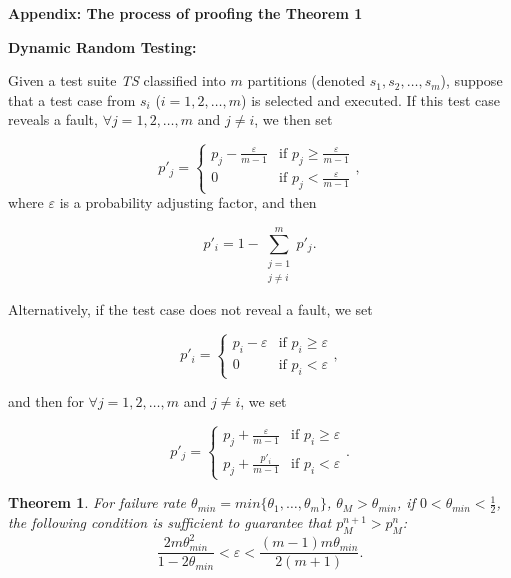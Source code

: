 \documentclass[10pt,journal,cspaper,compsoc,onecolumn]{IEEEtran}
\begin{document}
\large{\textbf{Appendix: The process of proofing the Theorem 1}}

\textbf{Dynamic Random Testing:}

Given a test suite \emph{TS} classified into $m$ partitions (denoted $s_1, s_2, \ldots, s_m$),  suppose that a test case from $s_i$ ($i = 1, 2, \ldots, m$) is selected and executed.
If this test case reveals a fault, $\forall j = 1, 2, \ldots, m$ and $j \neq i$, we then set

\begin{equation}
\label{eq:DRThitJ}
p'_j =
\begin{cases}
p_j - \displaystyle\frac{\varepsilon}{m-1} & \text{if } p_j \geq \displaystyle\frac{\varepsilon}{m-1} \\
0 & \text{if } p_j < \displaystyle\frac{\varepsilon}{m-1}
\end{cases},
\end{equation}
where $\varepsilon$ is a probability adjusting factor, and then

\begin{equation}
\label{eq:DRThitI}
  p'_i = 1 - \sum_{\substack{j = 1 \\ j \neq i}}^m p'_j.
\end{equation}

Alternatively, if the test case does not reveal a fault, we set

\begin{equation}
\label{eq:DRTmissI}
p'_i =
\begin{cases}
p_i - \varepsilon & \text{if } p_i \geq \varepsilon \\
0 & \text{if } p_i < \varepsilon
\end{cases},
\end{equation}

and then for $\forall j = 1, 2, \ldots, m$ and $j \neq i$, we set

\begin{equation}
\label{eq:DRTmissJ}
p'_j =
\begin{cases}
p_j + \displaystyle\frac{\varepsilon}{m-1} & \text{if } p_i \geq \varepsilon \\
p_j + \displaystyle\frac{p'_i}{m-1} & \text{if } p_i < \varepsilon
\end{cases}.
\end{equation}

\newtheorem{my}{Theorem}
\label{theorem}
\begin{my}
  For failure rate $\theta_{min} = min\{\theta_1, \ldots, \theta_m\}$, $\theta_M > \theta_{min}$, if $0 < \theta_{min} < \frac{1}{2}$, the following condition is sufficient to guarantee that $p_M^{n + 1} > p_M^{n}$:
  \begin{equation}
\label{equa:results}
  \displaystyle\frac{2m\theta_{min}^2}{1-2\theta_{min}} < \varepsilon < \displaystyle\frac{(m-1)m\theta_{min}}{2(m + 1)}.
\end{equation}
\end{my}
\end{document}

